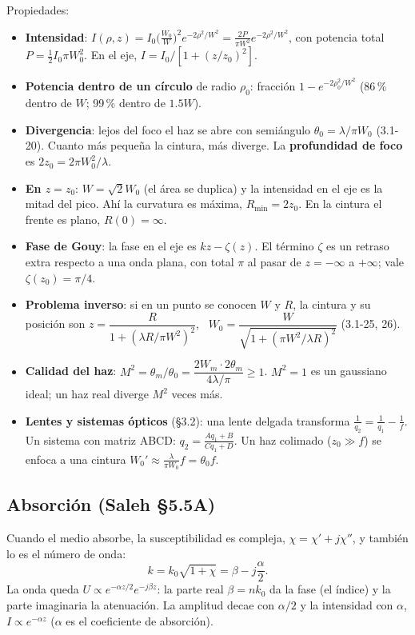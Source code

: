 \documentclass[10pt]{article}
\begin{document}
Propiedades:
\begin{itemize}
\item \textbf{Intensidad}: $I(\rho,z)=I_0\big(\frac{W_0}{W}\big)^2e^{-2\rho^2/W^2}=\frac{2P}{\pi W^2}e^{-2\rho^2/W^2}$, con potencia total $P=\frac12I_0\pi W_0^2$. En el eje, $I=I_0/[1+(z/z_0)^2]$.
\item \textbf{Potencia dentro de un círculo} de radio $\rho_0$: fracción $1-e^{-2\rho_0^2/W^2}$ (86\,\% dentro de $W$; 99\,\% dentro de $1.5W$).
\item \textbf{Divergencia}: lejos del foco el haz se abre con semiángulo $\theta_0=\lambda/\pi W_0$ (3.1-20). Cuanto más pequeña la cintura, más diverge. La \textbf{profundidad de foco} es $2z_0=2\pi W_0^2/\lambda$.
\item \textbf{En $z=z_0$}: $W=\sqrt2W_0$ (el área se duplica) y la intensidad en el eje es la mitad del pico. Ahí la curvatura es máxima, $R_{\min}=2z_0$. En la cintura el frente es plano, $R(0)=\infty$.
\item \textbf{Fase de Gouy}: la fase en el eje es $kz-\zeta(z)$. El término $\zeta$ es un retraso extra respecto a una onda plana, con total $\pi$ al pasar de $z=-\infty$ a $+\infty$; vale $\zeta(z_0)=\pi/4$.
\item \textbf{Problema inverso}: si en un punto se conocen $W$ y $R$, la cintura y su posición son
$z=\dfrac{R}{1+(\lambda R/\pi W^2)^2}$, \ $W_0=\dfrac{W}{\sqrt{1+(\pi W^2/\lambda R)^2}}$ (3.1-25, 26).
\item \textbf{Calidad del haz}: $M^2=\theta_m/\theta_0=\dfrac{2W_m\cdot2\theta_m}{4\lambda/\pi}\ge1$. $M^2=1$ es un gaussiano ideal; un haz real diverge $M^2$ veces más.
\item \textbf{Lentes y sistemas ópticos} (§3.2): una lente delgada transforma $\frac1{q_2}=\frac1{q_1}-\frac1f$. Un sistema con matriz ABCD: $q_2=\frac{Aq_1+B}{Cq_1+D}$. Un haz colimado ($z_0\gg f$) se enfoca a una cintura $W_0'\approx\frac{\lambda}{\pi W_0}f=\theta_0f$.
\end{itemize}

\subsection{Absorción (Saleh §5.5A)}
Cuando el medio absorbe, la susceptibilidad es compleja, $\chi=\chi'+j\chi''$, y también lo es el número de onda:
\[
k=k_0\sqrt{1+\chi}=\beta-j\frac{\alpha}{2}.
\]
La onda queda $U\propto e^{-\alpha z/2}e^{-j\beta z}$: la parte real $\beta=nk_0$ da la fase (el índice) y la parte imaginaria la atenuación. La amplitud decae con $\alpha/2$ y la intensidad con $\alpha$, $I\propto e^{-\alpha z}$ ($\alpha$ es el coeficiente de absorción).
\end{document}
